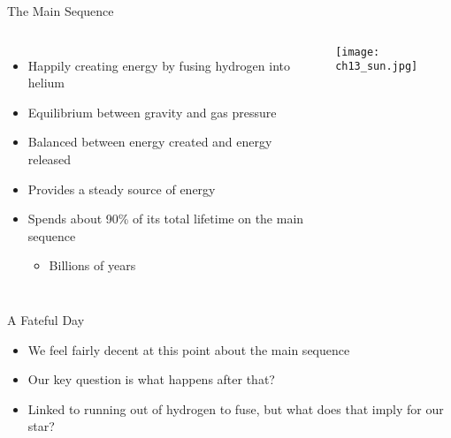 \documentclass[pdf, aspectratio=169]{beamer}
\begin{document}
\begin{frame}{The Main Sequence}
  \begin{columns}
	\begin{itemize}
	  \item Happily creating energy by fusing hydrogen into helium
	  \item Equilibrium between gravity and gas pressure
	  \item Balanced between energy created and energy released
	  \item Provides a steady source of energy
	  \item Spends about 90\% of its total lifetime on the main sequence
		\begin{itemize}
		  \item Billions of years
		\end{itemize}
	\end{itemize}
	\begin{center}
	  \texttt{[image: ch13\_sun.jpg]}
	\end{center}
  \end{columns}
\end{frame}

\begin{frame}{A Fateful Day}
  \begin{itemize}
	\item We feel fairly decent at this point about the main sequence
	\item Our key question is what happens after that?
	\item Linked to running out of hydrogen to fuse, but \alert{what does that imply for our star?}
  \end{itemize}
\end{frame}
\end{document}
